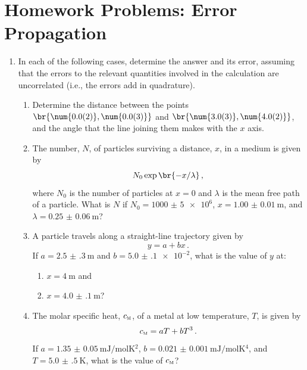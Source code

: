 
\maketitle

\section{Homework Problems: Error Propagation} %
\label{sec:homework_problems_error_propagation}

\begin{enumerate}
	\item In each of the following cases, determine the answer and its error, assuming that the errors to the relevant quantities involved in the calculation are uncorrelated (i.e., the errors add in quadrature).
	\begin{enumerate}
		\item Determine the distance between the points \( \br{\num{0.0(2)}, \num{0.0(3)}} \) and \( \br{\num{3.0(3)}, \num{4.0(2)}} \), and the angle that the line joining them makes with the \( x \) axis. 
		\item The number, \( N \), of particles surviving a distance, \( x \), in a medium is given by \[ 
		N_0 \exp\br{-x/\lambda} \, ,
		\] 
		where \( N_0 \) is the number of particles at \( x = 0 \) and \( \lambda \) is the mean free path of a particle. 
		What is \( N \) if \( N_0=\num{1000(5)e6} \), \( x = \qty{1.00(1)}{\m} \), and \( \lambda = \qty{0.25(6)}{\m} \)?
		
		\item A particle travels along a straight-line trajectory given by \[
		 y = a + bx \, .
		 \] 
		If \( a = \qty{2.5(3)}{\m} \) and \( b = \num{5.0(1)e-2} \), what is the value of \( y \) at:
		\begin{enumerate}
			\item \( x = \qty{4}{\m} \) and
			
			\item \( x = \qty{4.0(1)}{\m} \)?
		\end{enumerate}
		
		\item The molar specific heat, \( c_{\textsc{m}} \), of a metal at low temperature, \( T \), is given by \[
			c_{\textsc{m}} = a T + b T^3 \, .
		\]
		If \( a = \qty{1.35(5)}{\mJ\per\mol\K^2} \), \( b = \qty{0.021(1)}{\mJ\per\mol\K^4} \), and \( T = \qty{5.0(5)}{\K} \), what is the value of \( c_{\textsc{m}} \)?
	\end{enumerate}
	

\end{enumerate}
